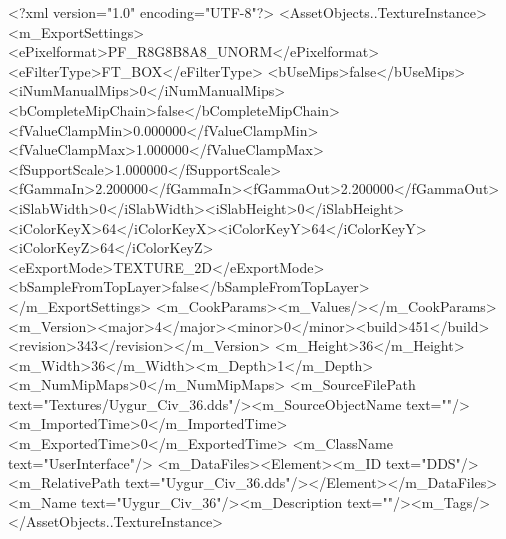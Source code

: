 <?xml version="1.0" encoding="UTF-8"?>
<AssetObjects..TextureInstance>
  <m_ExportSettings>
    <ePixelformat>PF_R8G8B8A8_UNORM</ePixelformat><eFilterType>FT_BOX</eFilterType>
    <bUseMips>false</bUseMips><iNumManualMips>0</iNumManualMips><bCompleteMipChain>false</bCompleteMipChain>
    <fValueClampMin>0.000000</fValueClampMin><fValueClampMax>1.000000</fValueClampMax><fSupportScale>1.000000</fSupportScale>
    <fGammaIn>2.200000</fGammaIn><fGammaOut>2.200000</fGammaOut><iSlabWidth>0</iSlabWidth><iSlabHeight>0</iSlabHeight>
    <iColorKeyX>64</iColorKeyX><iColorKeyY>64</iColorKeyY><iColorKeyZ>64</iColorKeyZ>
    <eExportMode>TEXTURE_2D</eExportMode><bSampleFromTopLayer>false</bSampleFromTopLayer>
  </m_ExportSettings>
  <m_CookParams><m_Values/></m_CookParams>
  <m_Version><major>4</major><minor>0</minor><build>451</build><revision>343</revision></m_Version>
  <m_Height>36</m_Height><m_Width>36</m_Width><m_Depth>1</m_Depth><m_NumMipMaps>0</m_NumMipMaps>
  <m_SourceFilePath text="Textures/Uygur_Civ_36.dds"/><m_SourceObjectName text=""/>
  <m_ImportedTime>0</m_ImportedTime><m_ExportedTime>0</m_ExportedTime>
  <m_ClassName text="UserInterface"/>
  <m_DataFiles><Element><m_ID text="DDS"/><m_RelativePath text="Uygur_Civ_36.dds"/></Element></m_DataFiles>
  <m_Name text="Uygur_Civ_36"/><m_Description text=""/><m_Tags/>
</AssetObjects..TextureInstance>
